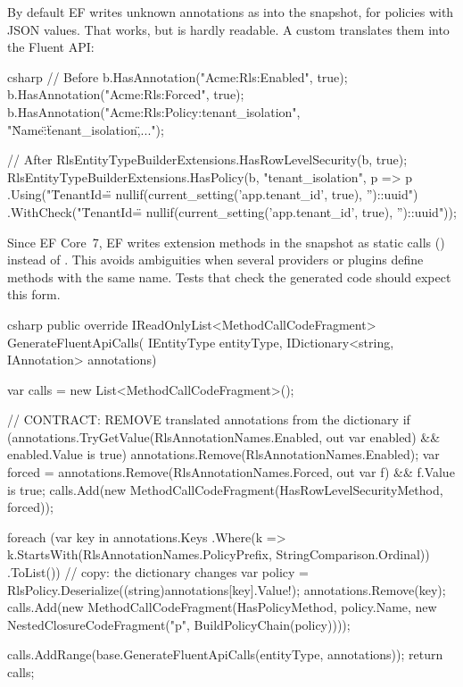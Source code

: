 By default EF writes unknown annotations as
into the snapshot, for policies with JSON values. That works, but is hardly readable. A
custom  translates them into the
Fluent API:

\begin{sourcecode}{csharp}
// Before
b.HasAnnotation("Acme:Rls:Enabled", true);
b.HasAnnotation("Acme:Rls:Forced", true);
b.HasAnnotation("Acme:Rls:Policy:tenant_isolation", "{\"Name\":\"tenant_isolation\",...}");

// After
RlsEntityTypeBuilderExtensions.HasRowLevelSecurity(b, true);
RlsEntityTypeBuilderExtensions.HasPolicy(b, "tenant_isolation", p => p
    .Using("\"TenantId\" = nullif(current_setting('app.tenant_id', true), '')::uuid")
    .WithCheck("\"TenantId\" = nullif(current_setting('app.tenant_id', true), '')::uuid"));
\end{sourcecode}

Since EF Core~7, EF writes extension methods in the snapshot as static calls
() instead of
. This
avoids ambiguities when several providers or plugins define methods with the same name.
Tests that check the generated code should expect this form.

\begin{sourcecode}{csharp}
public override IReadOnlyList<MethodCallCodeFragment> GenerateFluentApiCalls(
    IEntityType entityType, IDictionary<string, IAnnotation> annotations)
{
    var calls = new List<MethodCallCodeFragment>();

    // CONTRACT: REMOVE translated annotations from the dictionary
    if (annotations.TryGetValue(RlsAnnotationNames.Enabled, out var enabled)
        && enabled.Value is true)
    {
        annotations.Remove(RlsAnnotationNames.Enabled);
        var forced = annotations.Remove(RlsAnnotationNames.Forced, out var f)
                     && f.Value is true;
        calls.Add(new MethodCallCodeFragment(HasRowLevelSecurityMethod, forced));
    }

    foreach (var key in annotations.Keys
                 .Where(k => k.StartsWith(RlsAnnotationNames.PolicyPrefix,
                                          StringComparison.Ordinal))
                 .ToList())                         // copy: the dictionary changes
    {
        var policy = RlsPolicy.Deserialize((string)annotations[key].Value!);
        annotations.Remove(key);
        calls.Add(new MethodCallCodeFragment(HasPolicyMethod, policy.Name,
            new NestedClosureCodeFragment("p", BuildPolicyChain(policy))));
    }

    calls.AddRange(base.GenerateFluentApiCalls(entityType, annotations));
    return calls;
}
\end{sourcecode}

